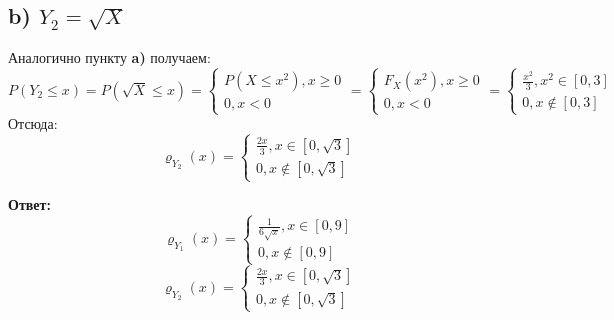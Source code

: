 \documentclass[a4paper,12pt]{article}
\begin{document}
\subsection*{b) $Y_2 = \sqrt{X}$}
Аналогично пункту \textbf{a)} получаем:
\[
P(Y_2 \leq x) = P(\sqrt{X} \leq x) = \begin{cases}
P(X \leq x^2), x \geq 0 \\
0 , x < 0
\end{cases}
=
\begin{cases}
F_X(x^2), x \geq 0 \\
0, x < 0 
\end{cases}
=
\begin{cases}
\frac{x^2}{3}, x^2 \in [0, 3] \\
0, x \notin [0, 3]
\end{cases}
\]
Отсюда:
\[
\varrho_{Y_2}(x) = \begin{cases}
\frac{2x}{3}, x \in [0, \sqrt{3}] \\
0, x \notin [0, \sqrt{3}]
\end{cases}
\]
\begin{center}
\textbf{Ответ: } 
\[
\varrho_{Y_1}(x) = \begin{cases}
\frac{1}{6\sqrt{x}}, x \in [0, 9] \\
0, x \notin [0, 9]
\end{cases}
\]
\[
\varrho_{Y_2}(x) = \begin{cases}
\frac{2x}{3}, x \in [0, \sqrt{3}] \\
0, x \notin [0, \sqrt{3}]
\end{cases}
\]
\end{center}
\clearpage
\end{document}
